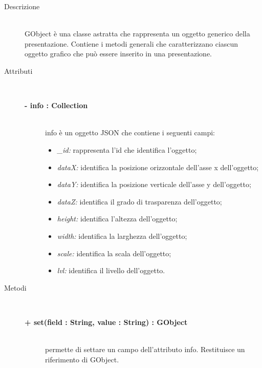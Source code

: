 \begin{description}
\item[Descrizione] \hfill \\
	GObject è una classe astratta che rappresenta un oggetto generico della presentazione. Contiene i metodi generali che caratterizzano ciascun oggetto grafico che può essere inserito in una presentazione.
	
\item[Attributi] \hfill \\
	\begin{description}
		\item[\textbf{- info : Collection			}] \hfill \\
			info è un oggetto JSON che contiene i seguenti campi:
				\begin{itemize}
					\item \textit{\_id:} rappresenta l'id che identifica l'oggetto;
					\item \textit{dataX:} identifica la posizione orizzontale dell'asse x dell'oggetto;
					\item \textit{dataY:} identifica la posizione verticale dell'asse y dell'oggetto;
					\item \textit{dataZ:} identifica il grado di trasparenza dell'oggetto; %
					\item \textit{height:} identifica l'altezza dell'oggetto;
					\item \textit{width:} identifica la larghezza dell'oggetto;
					\item \textit{scale:} identifica la scala dell'oggetto; %
					\item \textit{lvl:} identifica il livello dell'oggetto. %
				\end{itemize}
					 
		
	\end{description}
	
	
\item[Metodi] \hfill \\

	\begin{description}
		\item[\textbf{\color{blue}+ set(field : String, value : String) : GObject			}] \hfill \\
			permette di settare un campo dell'attributo info. Restituisce un riferimento di GObject.
			

\end{description}
\end{description}
